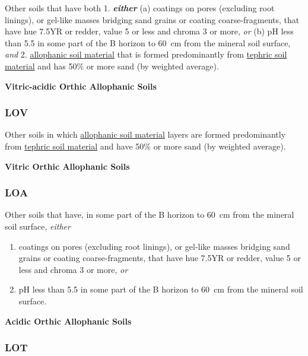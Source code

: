 \documentclass[
  letterpaper,
  DIV=11,
  numbers=noendperiod]{scrreprt}
\providecommand{\tightlist}{%
  \setlength{\itemsep}{0pt}\setlength{\parskip}{0pt}}\usepackage{longtable,booktabs,array}
\begin{document}
Other soils that have both 1. \textbf{\emph{either}} (a) coatings on
pores (excluding root linings), or gel-like masses bridging sand grains
or coating coarse-fragments, that have hue 7.5YR or redder, value 5 or
less and chroma 3 or more, \emph{or} (b) pH less than 5.5 in some part
of the B horizon to 60~cm from the mineral soil surface, \emph{and} 2.
\protect\hyperlink{sec-diag-alloph}{allophanic soil material} that is
formed predominantly from \protect\hyperlink{sec-diag-teph}{tephric soil
material} and has 50\% or more sand (by weighted average).

\textbf{Vitric-acidic Orthic Allophanic Soils}

\hypertarget{sec-key-LOV}{%
\subsubsection{\texorpdfstring{\textbf{LOV}}{LOV}}\label{sec-key-LOV}}

Other soils in which \protect\hyperlink{sec-diag-alloph}{allophanic soil
material} layers are formed predominantly from
\protect\hyperlink{sec-diag-teph}{tephric soil material} and have 50\%
or more sand (by weighted average).

\textbf{Vitric Orthic Allophanic Soils}

\hypertarget{sec-key-LOA}{%
\subsubsection{\texorpdfstring{\textbf{LOA}}{LOA}}\label{sec-key-LOA}}

Other soils that have, in some part of the B horizon to 60~cm from the
mineral soil surface, \emph{either}

\begin{enumerate}
\def\labelenumi{\arabic{enumi}.}
\tightlist
\item
  coatings on pores (excluding root linings), or gel-like masses
  bridging sand grains or coating coarse-fragments, that have hue 7.5YR
  or redder, value 5 or less and chroma 3 or more, \emph{or}
\item
  pH less than 5.5 in some part of the B horizon to 60~cm from the
  mineral soil surface.
\end{enumerate}

\textbf{Acidic Orthic Allophanic Soils}

\hypertarget{sec-key-LOT}{%
\subsubsection{\texorpdfstring{\textbf{LOT}}{LOT}}\label{sec-key-LOT}}
\end{document}
